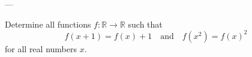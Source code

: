 
---

Determine all functions $f:\mathbb R\to\mathbb R$ such that \[f(x+1)=f(x)+1\quad\text{and}\quad f\left(x^2\right)=f(x)^2\]
for all real numbers $x$.
